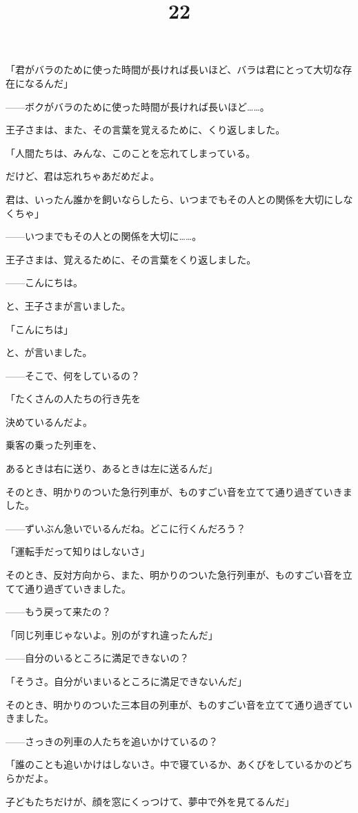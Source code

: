 「君がバラのために使った時間が長ければ長いほど、バラは君にとって大切な存在になるんだ」

——ボクがバラのために使った時間が長ければ長いほど……。

王子さまは、また、その言葉を覚えるために、くり返しました。

「人間たちは、みんな、このことを忘れてしまっている。

だけど、君は忘れちゃあだめだよ。

君は、いったん誰かを飼いならしたら、いつまでもその人との関係を大切にしなくちゃ」

——いつまでもその人との関係を大切に……。

王子さまは、覚えるために、その言葉をくり返しました。

\title{22}

——こんにちは。

と、王子さまが言いました。

「こんにちは」

と、が言いました。


——そこで、何をしているの？

「たくさんの人たちの行き先を

決めているんだよ。

乗客の乗った列車を、

あるときは右に送り、あるときは左に送るんだ」

そのとき、明かりのついた急行列車が、ものすごい音を立てて通り過ぎていきました。

——ずいぶん急いでいるんだね。どこに行くんだろう？

「運転手だって知りはしないさ」

そのとき、反対方向から、また、明かりのついた急行列車が、ものすごい音を立てて通り過ぎていきました。

——もう戻って来たの？

「同じ列車じゃないよ。別のがすれ違ったんだ」

——自分のいるところに満足できないの？

「そうさ。自分がいまいるところに満足できないんだ」

そのとき、明かりのついた三本目の列車が、ものすごい音を立てて通り過ぎていきました。

——さっきの列車の人たちを追いかけているの？

「誰のことも追いかけはしないさ。中で寝ているか、あくびをしているかのどちらかだよ。

子どもたちだけが、顔を窓にくっつけて、夢中で外を見てるんだ」

